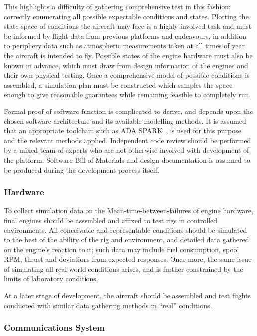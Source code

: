 This highlights a difficulty of gathering comprehensive test in this fashion: correctly enumerating all possible expectable conditions and states.
Plotting the state space of conditions the aircraft may face is a highly involved task and must be informed by flight data from previous platforms and endeavours, in addition to periphery data such as atmospheric measurements taken at all times of year the aircraft is intended to fly.
Possible states of the engine hardware must also be known in advance, which must draw from design information of the engines and their own physical testing.
Once a comprehensive model of possible conditions is assembled, a simulation plan must be constructed which samples the space enough to give reasonable guarantees while remaining feasible to completely run. 

Formal proof of software function is complicated to derive, and depends upon the chosen software architecture and its available modelling methods.
It is assumed that an appropriate toolchain such as ADA SPARK~\cite{SPARK2014}, is used for this purpose and the relevant methods applied.
Independent code review should be performed by a mixed team of experts who are not otherwise involved with development of the platform.
Software Bill of Materials and design documentation is assumed to be produced during the development process itself.

\subsubsection*{Hardware}

To collect simulation data on the Mean-time-between-failures of engine hardware, final engines should be assembled and affixed to test rigs in controlled environments.
All conceivable and representable conditions should be simulated to the best of the ability of the rig and environment, and detailed data gathered on the engine's reaction to it; such data may include fuel consumption, spool RPM, thrust and deviations from expected responses.
Once more, the same issue of simulating all real-world conditions arises, and is further constrained by the limits of laboratory conditions.

At a later stage of development, the aircraft should be assembled and test flights conducted with similar data gathering methods in ``real'' conditions.

\subsubsection*{Communications System}

